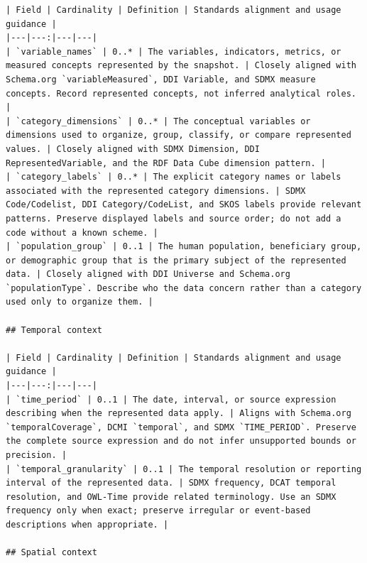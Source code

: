 \documentclass{article}
\begin{document}
\begin{lstlisting}
| Field | Cardinality | Definition | Standards alignment and usage guidance |
|---|---:|---|---|
| `variable_names` | 0..* | The variables, indicators, metrics, or measured concepts represented by the snapshot. | Closely aligned with Schema.org `variableMeasured`, DDI Variable, and SDMX measure concepts. Record represented concepts, not inferred analytical roles. |
| `category_dimensions` | 0..* | The conceptual variables or dimensions used to organize, group, classify, or compare represented values. | Closely aligned with SDMX Dimension, DDI RepresentedVariable, and the RDF Data Cube dimension pattern. |
| `category_labels` | 0..* | The explicit category names or labels associated with the represented category dimensions. | SDMX Code/Codelist, DDI Category/CodeList, and SKOS labels provide relevant patterns. Preserve displayed labels and source order; do not add a code without a known scheme. |
| `population_group` | 0..1 | The human population, beneficiary group, or demographic group that is the primary subject of the represented data. | Closely aligned with DDI Universe and Schema.org `populationType`. Describe who the data concern rather than a category used only to organize them. |

## Temporal context

| Field | Cardinality | Definition | Standards alignment and usage guidance |
|---|---:|---|---|
| `time_period` | 0..1 | The date, interval, or source expression describing when the represented data apply. | Aligns with Schema.org `temporalCoverage`, DCMI `temporal`, and SDMX `TIME_PERIOD`. Preserve the complete source expression and do not infer unsupported bounds or precision. |
| `temporal_granularity` | 0..1 | The temporal resolution or reporting interval of the represented data. | SDMX frequency, DCAT temporal resolution, and OWL-Time provide related terminology. Use an SDMX frequency only when exact; preserve irregular or event-based descriptions when appropriate. |

## Spatial context


\end{lstlisting}
\end{document}
